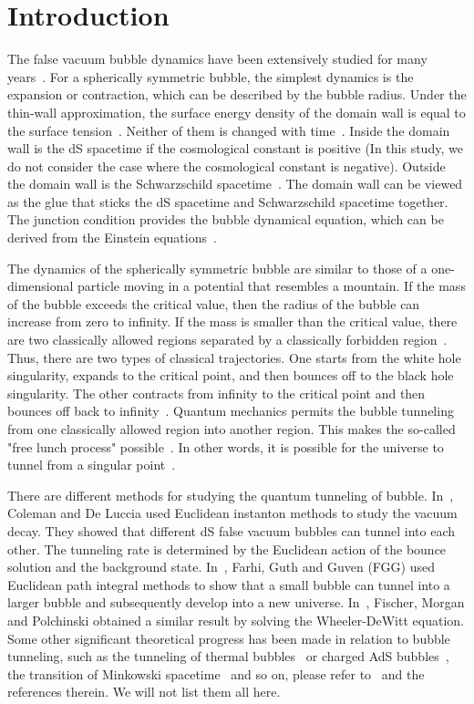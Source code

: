 \documentclass[12pt]{article}
\begin{document}
\baselineskip=0.7cm



\tableofcontents
\newpage
\section{Introduction}
\label{sec:0}
The false vacuum bubble dynamics have been extensively studied for many years~\cite{EAJ,KMHK,HMKK,K,VVI,SEA,JC,AME,SF,WDJ,SFVF}. For a spherically symmetric bubble, the simplest dynamics is the expansion or contraction, which can be described by the bubble radius. Under the thin-wall approximation, the surface energy density of the domain wall is equal to the surface tension~\cite{SEA}. Neither of them is changed with time~\cite{SEA}. Inside the domain wall is the dS spacetime if the cosmological constant is positive (In this study, we do not consider the case where the cosmological constant is negative). Outside the domain wall is the Schwarzschild spacetime~\cite{EAJ,SEA}. The domain wall can be viewed as the glue that sticks the dS spacetime and Schwarzschild spacetime together. The junction condition provides the bubble dynamical equation, which can be derived from the Einstein equations~\cite{W,SEA}.

The dynamics of the spherically symmetric bubble are similar to those of a one-dimensional particle moving in a potential that resembles a mountain. If the mass of the bubble exceeds the critical value, then the radius of the bubble can increase from  zero to infinity. If the mass is smaller than the critical value, there are two classically allowed regions separated by a classically forbidden region~\cite{EAJ,SEA,WDJ}. Thus, there are two types of classical trajectories. One starts from the white hole singularity, expands to the critical point, and then bounces off  to the black hole singularity. The other contracts from infinity to the critical point and then bounces off back to infinity~\cite{SFVF,WDJ}. Quantum mechanics permits the bubble tunneling from one classically allowed region into another region. This makes the so-called "free lunch process" possible~\cite{WDJ,EAJ}. In other words, it is possible for the universe to tunnel from a singular point~\cite{WDJ,EAJ,JS,A1,A2}.

There are different methods for studying the quantum tunneling of bubble. In~\cite{SF}, Coleman and De Luccia used Euclidean instanton methods to study the vacuum decay. They showed that different dS false vacuum bubbles can tunnel into each other. The tunneling rate is determined by the Euclidean action of the bounce solution and the background state. In~\cite{EAJ}, Farhi, Guth and Guven (FGG) used Euclidean path integral methods to show that a small bubble can tunnel into a larger bubble and subsequently develop into a new universe.  In~\cite{WDJ}, Fischer, Morgan and Polchinski obtained a similar result by solving the Wheeler-DeWitt equation. Some other significant theoretical progress has been made in relation to bubble tunneling, such as  the tunneling of thermal bubbles~\cite{AD1,AD2,OJ} or charged AdS bubbles~\cite{RJ}, the transition of Minkowski spacetime~\cite{SFVF} and so on,  please refer to~\cite{SFVF,OJ,RJ,dc,vf,jj} and the references therein. We will not list them all here.
\end{document}
